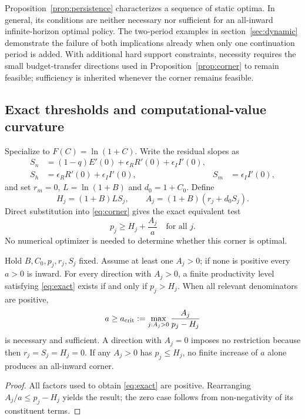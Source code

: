 Proposition~\ref{prop:persistence} characterizes a sequence of static
optima. In general, its conditions are neither necessary nor sufficient
for an all-inward infinite-horizon optimal policy. The two-period examples in
section~\ref{sec:dynamic} demonstrate the failure of both implications
already when only one continuation period is added.
With additional hard support constraints, necessity requires the small
budget-transfer directions used in Proposition~\ref{prop:corner} to remain
feasible; sufficiency is inherited whenever the corner remains feasible.

\subsection{Exact thresholds and computational-value curvature}
\label{sec:threshold}

Specialize to $F(C)=\ln(1+C)$. Write the residual slopes as
\begin{align}
 S_n&=(1-q)E'(0)+\epsilon_RR'(0)+\epsilon_II'(0),\nonumber\\
 S_h&=\epsilon_RR'(0)+\epsilon_II'(0),& S_m&=\epsilon_II'(0),
 \label{eq:slopes}
\end{align}
and set $r_m=0$, $L=\ln(1+B)$ and $d_0=1+C_0$. Define
\begin{equation}
 H_j=(1+B)L S_j,\qquad A_j=(1+B)(r_j+d_0S_j).
 \label{eq:HA}
\end{equation}
Direct substitution into \cref{eq:corner} gives the exact equivalent test
\begin{equation}
 \boxed{p_j\geq H_j+\frac{A_j}{a}\quad\text{for all }j.}
 \label{eq:exact}
\end{equation}
No numerical optimizer is needed to determine whether this corner is optimal.

\begin{proposition}
\label{prop:threshold}
Hold $B,C_0,p_j,r_j,S_j$ fixed. Assume at least one $A_j>0$; if none is positive every $a>0$ is inward. For every direction with $A_j>0$, a finite productivity level satisfying \cref{eq:exact} exists if and only if $p_j>H_j$. When all relevant denominators are positive,
\begin{equation}
 a\geq a_{\rm crit}:=\max_{j:A_j>0}\frac{A_j}{p_j-H_j}
 \label{eq:acrit}
\end{equation}
is necessary and sufficient. A direction with $A_j=0$ imposes no restriction because then $r_j=S_j=H_j=0$. If any $A_j>0$ has $p_j\leq H_j$, no finite increase of $a$ alone produces an all-inward corner.
\end{proposition}
\begin{proof}
All factors used to obtain \cref{eq:exact} are positive. Rearranging $A_j/a\leq p_j-H_j$ yields the result; the zero case follows from non-negativity of its constituent terms.
\end{proof}

